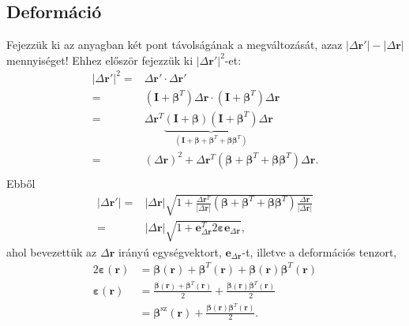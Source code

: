 \documentclass[12pt,a4paper]{scrartcl}
\let\mathbf\bm
\begin{document}
\subsection{Deformáció}
Fejezzük ki az anyagban két pont távolságának a megváltozását, azaz $\left| {\Delta {\mathbf{r}}'} \right| - \left| {\Delta {\mathbf{r}}} \right|$ mennyiséget! Ehhez először fejezzük ki ${\left| {\Delta {\mathbf{r}}'} \right|^2}$-et:
\[\begin{aligned}
  {\left| {\Delta {\mathbf{r}}'} \right|^2} =  & \Delta {\mathbf{r}}' \cdot \Delta {\mathbf{r}}' \\ 
   =  & \left( {{\mathbf{I}} + {{\mathbf{\beta }}^T}} \right)\Delta {\mathbf{r}} \cdot \left( {{\mathbf{I}} + {{\mathbf{\beta }}^T}} \right)\Delta {\mathbf{r}} \\ 
   =  & \Delta {\mathbf{r}}^T\underbrace {\left( {{\mathbf{I}} + {\mathbf{\beta }}} \right)\left( {{\mathbf{I}} + {{\mathbf{\beta }}^T}} \right)}_{\left( {{\mathbf{I}} + {\mathbf{\beta }} + {{\mathbf{\beta }}^T} + {\mathbf{\beta }}{{\mathbf{\beta }}^T}} \right)}\Delta {\mathbf{r}} \\ 
   =  & {\left( {\Delta {\mathbf{r}}} \right)^2} + \Delta {\mathbf{r}}^T\left( {{\mathbf{\beta }} + {{\mathbf{\beta }}^T} + {\mathbf{\beta }}{{\mathbf{\beta }}^T}} \right)\Delta {\mathbf{r}} .\\ 
\end{aligned} \]
Ebből
\begin{align} \label{eq:deform_def}
  \left| {\Delta {\mathbf{r}}'} \right| =  & \left| {\Delta {\mathbf{r}}} \right|\sqrt {1 + \frac{{\Delta {\mathbf{r}}^T}}{{\left| {\Delta {\mathbf{r}}} \right|}}\left( {{\mathbf{\beta }} + {{\mathbf{\beta }}^T} + {\mathbf{\beta }}{{\mathbf{\beta }}^T}} \right)\frac{{\Delta {\mathbf{r}}}}{{\left| {\Delta {\mathbf{r}}} \right|}}}  \nonumber \\ 
   =  & \left| {\Delta {\mathbf{r}}} \right|\sqrt {1 + {{\mathbf{e}}_{\Delta {\mathbf{r}}}^T}2{\mathbf{\varepsilon }}{{\mathbf{e}}_{\Delta {\mathbf{r}}}}},
\end{align}
ahol bevezettük az ${\Delta {\mathbf{r}}}$ irányú egységvektort, ${{\mathbf{e}}_{\Delta {\mathbf{r}}}}$-t, illetve a deformációs tenzort,
\[\begin{aligned}
  2{\mathbf{\varepsilon }}\left( {\mathbf{r}} \right) &  = {\mathbf{\beta }}\left( {\mathbf{r}} \right) + {{\mathbf{\beta }}^T}\left( {\mathbf{r}} \right) + {\mathbf{\beta }}\left( {\mathbf{r}} \right){{\mathbf{\beta }}^T}\left( {\mathbf{r}} \right) \\ 
  {\mathbf{\varepsilon }}\left( {\mathbf{r}} \right) &  = \frac{{{\mathbf{\beta }}\left( {\mathbf{r}} \right) + {{\mathbf{\beta }}^T}\left( {\mathbf{r}} \right)}}{2} + \frac{{{\mathbf{\beta }}\left( {\mathbf{r}} \right){{\mathbf{\beta }}^T}\left( {\mathbf{r}} \right)}}{2} \\ 
   &  = {{\mathbf{\beta }}^{{\text{sz}}}}\left( {\mathbf{r}} \right) + \frac{{{\mathbf{\beta }}\left( {\mathbf{r}} \right){{\mathbf{\beta }}^T}\left( {\mathbf{r}} \right)}}{2}.\\ 
\end{aligned} \]
\end{document}
